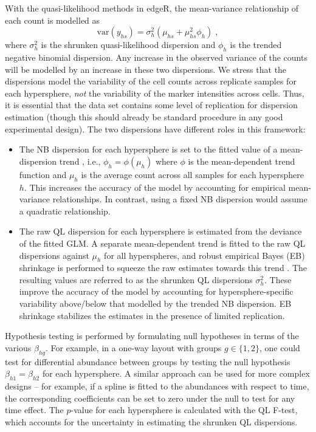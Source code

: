 \documentclass{article}
\begin{document}
With the quasi-likelihood methods in edgeR, the mean-variance relationship of each count is modelled as
\[
    \mbox{var}(y_{hs}) = \sigma^2_{h} (\mu_{hs} + \mu_{hs}^2 \phi_h) \;,
\]
where $\sigma^2_h$ is the shrunken quasi-likelihood dispersion and $\phi_h$ is the trended negative binomial dispersion.
Any increase in the observed variance of the counts will be modelled by an increase in these two dispersions.
We stress that the dispersions model the variability of the cell counts across replicate samples for each hypersphere, \textit{not} the variability of the marker intensities across cells.
Thus, it is essential that the data set contains some level of replication for dispersion estimation (though this should already be standard procedure in any good experimental design).
The two dispersions have different roles in this framework:
\begin{itemize}
    \item 
The NB dispersion for each hypersphere is set to the fitted value of a mean-dispersion trend \cite{mccarthy2012differential}, i.e., $\phi_h = \phi(\mu_h)$ where $\phi$ is the mean-dependent trend function and $\mu_h$ is the average count across all samples for each hypersphere $h$.
This increases the accuracy of the model by accounting for empirical mean-variance relationships.
In contrast, using a fixed NB dispersion would assume a quadratic relationship.
\item 
The raw QL dispersion for each hypersphere is estimated from the deviance of the fitted GLM.
A separate mean-dependent trend is fitted to the raw QL dispersions against $\mu_h$ for all hyperspheres, and robust empirical Bayes (EB) shrinkage is performed to squeeze the raw estimates towards this trend \cite{lund2012detecting,phipson2016robust}.
The resulting values are referred to as the shrunken QL dispersions $\sigma^2_h$.
These improve the accuracy of the model by accounting for hypersphere-specific variability above/below that modelled by the trended NB dispersion.
EB shrinkage stabilizes the estimates in the presence of limited replication.
\end{itemize}

Hypothesis testing is performed by formulating null hypotheses in terms of the various $\beta_{hg}$.
For example, in a one-way layout with groups $g\in\{1,2\}$, one could test for differential abundance between groups by testing the null hypothesis $\beta_{h1}=\beta_{h2}$ for each hypersphere.
A similar approach can be used for more complex designs -- for example, if a spline is fitted to the abundances with respect to time, the corresponding coefficients can be set to zero under the null to test for any time effect.
The $p$-value for each hypersphere is calculated with the QL F-test, which accounts for the uncertainty in estimating the shrunken QL dispersions. 
\end{document}
